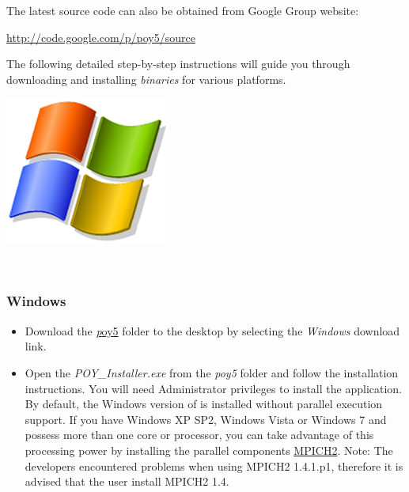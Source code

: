 The latest source code can also be obtained from \poy Google Group website:
\begin{center}
\url{http://code.google.com/p/poy5/source}
\end{center}

The following detailed step-by-step instructions will guide you through downloading and installing \poy \emph{binaries} for various platforms.

\begin{flushleft}
	\begin{minipage}[c]{0.074\textwidth}
	   	\includegraphics[width=\textwidth]{doc/figures/figlogowindows.jpg}
	\end{minipage}
	\,
	\begin{minipage}[t]{0.88\textwidth}
		   	\subsubsection*{Windows}
	\end{minipage}
		\begin{itemize}
			\item
                Download the
                \href{http://research.amnh.org/scicomp/projects/poy.php}{\emph poy5} folder to the desktop by 
                selecting the \emph{Windows} download link.

			\item 
           Open the \emph{POY\_Installer.exe} from the \emph{poy5} folder and follow the installation instructions. 
           You will need Administrator privileges to install the application. 
           By default, the Windows version of \poy is installed without parallel execution support. If you have 
           Windows XP SP2, Windows Vista or Windows 7 and possess more than one core or processor, you 
           can take advantage of this processing power by installing the parallel components 
           \href{http://www-unix.mcs.anl.gov/mpi/}{MPICH2}. 
           Note: The developers encountered problems when using MPICH2 1.4.1.p1, therefore it is advised that the 
           user install MPICH2 1.4.
          \end{itemize}


\end{flushleft}
